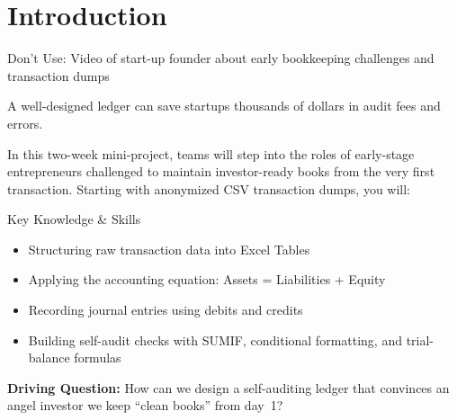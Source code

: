 \section{Introduction}
\begin{Replace}
Don't Use: Video of start-up founder about early bookkeeping challenges and transaction dumps
\end{Replace}

\begin{Trivia}
A well-designed ledger can save startups thousands of dollars in audit fees and errors.
\end{Trivia}

In this two-week mini-project, teams will step into the roles of early-stage entrepreneurs challenged to maintain investor-ready books from the very first transaction. Starting with anonymized CSV transaction dumps, you will:

\begin{skillbox}{Key Knowledge \& Skills}
\begin{itemize}
  \item Structuring raw transaction data into Excel Tables
  \item Applying the accounting equation: Assets = Liabilities + Equity
  \item Recording journal entries using debits and credits
  \item Building self-audit checks with SUMIF, conditional formatting, and trial-balance formulas
\end{itemize}
\end{skillbox}

\begin{Important}
\textbf{Driving Question:} How can we design a self-auditing ledger that convinces an angel investor we keep “clean books” from day 1?
\end{Important}


\clearpage